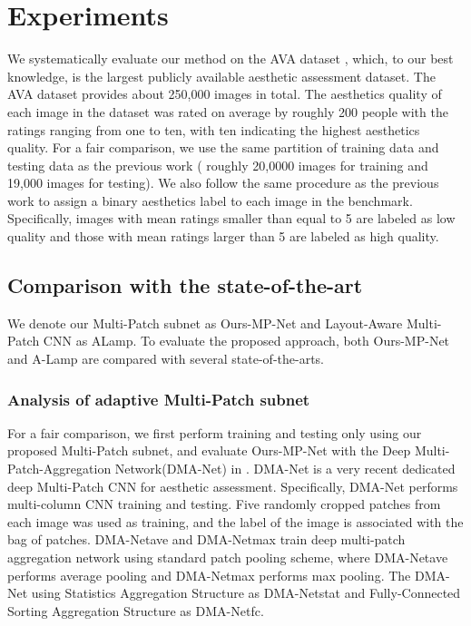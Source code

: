 \documentclass[10pt,twocolumn,letterpaper]{article}
\begin{document}
\section{Experiments}
We systematically evaluate our method on the AVA dataset \cite{MMP2012:AVA}, which, to our best knowledge, is the largest publicly available aesthetic assessment dataset. The AVA dataset provides about 250,000 images in total. The aesthetics quality of each image in the dataset was rated on average by roughly 200 people with the ratings ranging from one to ten, with ten indicating the highest aesthetics quality. For a fair comparison, we use the same partition of training data and testing data as the previous
work \cite{Lu:2014:ACMMM} \cite{Lu:2015:ICCV} \cite{Mai:2016:CVPR} \cite{MMP2012:AVA} ( roughly 20,0000 images for training and 19,000 images for testing). We also follow the same procedure as the previous work to assign a binary aesthetics label to each image in the benchmark. Specifically, images with mean ratings smaller than equal to 5 are labeled as low quality and those with mean ratings larger than 5 are labeled as high quality. 

\subsection{Comparison with the state-of-the-art}

We denote our Multi-Patch subnet as Ours-MP-Net and Layout-Aware Multi-Patch CNN as ALamp. To evaluate the proposed approach, both Ours-MP-Net and A-Lamp are compared with several state-of-the-arts.

\subsubsection{Analysis of adaptive Multi-Patch subnet}
For a fair comparison, we first perform training and testing only using our proposed Multi-Patch subnet, and evaluate Ours-MP-Net with the Deep Multi-Patch-Aggregation Network(DMA-Net) in \cite{Lu:2015:ICCV}. DMA-Net is a very recent dedicated deep Multi-Patch CNN for aesthetic assessment.
Specifically, DMA-Net performs multi-column CNN training and testing. Five randomly cropped patches from each image was used as training, and the label of the image is associated with the bag of patches. DMA-Net{\tiny ave} and DMA-Net{\tiny max} train deep multi-patch aggregation network using standard patch pooling scheme, where DMA-Net{\tiny ave} performs average pooling and DMA-Net{\tiny max} performs max pooling. The DMA-Net using Statistics Aggregation Structure as DMA-Net{\tiny stat} and Fully-Connected Sorting Aggregation Structure as DMA-Net{\tiny fc}. 
\end{document}
